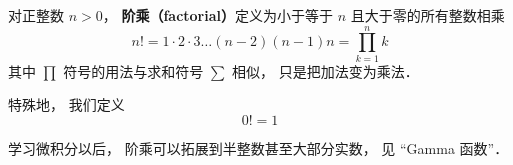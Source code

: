 
\begin{issues}
\issueDraft
\end{issues}

对正整数 $n > 0$， \textbf{阶乘（factorial）}定义为小于等于 $n$ 且大于零的所有整数相乘
\begin{equation}
n! = 1 \cdot 2 \cdot 3 \dots (n - 2) (n - 1)n = \prod_{k = 1}^n k
\end{equation}
其中 $\prod$ 符号的用法与求和符号 $\sum$ 相似， 只是把加法变为乘法． %

特殊地， 我们定义
\begin{equation}
0! = 1
\end{equation}

学习微积分以后， 阶乘可以拓展到半整数甚至大部分实数， 见 “Gamma 函数”．
